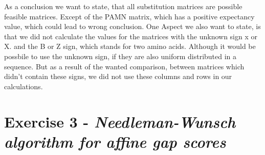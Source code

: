 \documentclass[%
   10pt,              %
   nenglish,           %
   a4paper,           %
   DIV11,             %
]{scrartcl}%
\begin{document}
 As a conclusion we want to state, that all substitution matrices are possible feasible matrices. Except of the PAMN matrix, which has a positive expectancy value, which could lead to wrong conclusion.
One Aspect we also want to state, is that we did not calculate the values for the matrices with the unknown sign x or X. and the B or Z sign,  which stands for two amino acids. Although it would be possbile to use the unknown sign, if they are also uniform distributed in a sequence. But as a result of the wanted comparison, between matrices which didn't contain these signs, we did not use these columns and rows in our calculations.
 
 \section*{Exercise 3 - \textsl{Needleman-Wunsch algorithm for affine gap scores}}
 
  
\end{document}
